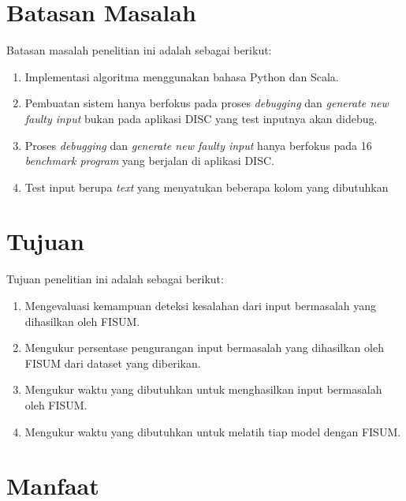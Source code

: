 \section{Batasan Masalah}
\label{sec:batasanmasalah}

Batasan masalah penelitian ini adalah sebagai berikut:

\begin{enumerate}[nolistsep]

  \item Implementasi algoritma menggunakan bahasa Python dan Scala.

  \item Pembuatan sistem hanya berfokus pada proses \emph{debugging} dan \emph{generate new faulty input} bukan pada aplikasi DISC yang test inputnya akan didebug.

  \item Proses \emph{debugging} dan \emph{generate new faulty input} hanya berfokus pada 16 \emph{benchmark program} yang berjalan di aplikasi DISC. 

  \item Test input berupa \emph{text} yang menyatukan beberapa kolom yang dibutuhkan

\end{enumerate}

\section{Tujuan}
\label{sec:Tujuan}

Tujuan penelitian ini adalah sebagai berikut:

\begin{enumerate}[nolistsep]

  \item Mengevaluasi kemampuan deteksi kesalahan dari input bermasalah yang dihasilkan oleh FISUM.
  \item Mengukur persentase pengurangan input bermasalah yang dihasilkan oleh FISUM dari dataset yang diberikan.
  \item Mengukur waktu yang dibutuhkan untuk menghasilkan input bermasalah oleh FISUM.
  \item Mengukur waktu yang dibutuhkan untuk melatih tiap model dengan FISUM.

\end{enumerate}

\section{Manfaat}
\label{sec:Manfaat}

